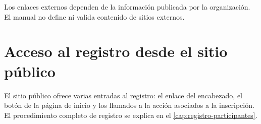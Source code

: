 \begin{nota}
Los enlaces externos dependen de la información publicada por la organización. El manual no define ni valida contenido de sitios externos.
\end{nota}

\section{Acceso al registro desde el sitio público}

El sitio público ofrece varias entradas al registro: el enlace  del encabezado, el botón  de la página de inicio y los llamados a la acción asociados a la inscripción. El procedimiento completo de registro se explica en el \cref{cap:registro-participantes}.
